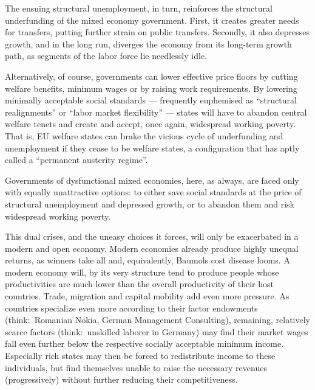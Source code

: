 The ensuing structural unemployment, in turn, reinforces the structural underfunding of the mixed economy government.
First, it creates greater needs for transfers, putting further strain on public transfers.
Secondly, it also depresses growth, and in the long run, diverges the economy from its long-term growth path, as segments of the labor force lie needlessly idle.


Alternatively, of course, governments can lower effective price floors by cutting welfare benefits, minimum wages or by raising work requirements.
By lowering minimally acceptable social standards --- frequently euphemised as ``structural realignments'' or ``labor market flexibility'' --- states will have to abandon central welfare tenets and create and accept, once again, widespread working poverty.
That is, \gls{EU} welfare states can brake the vicious cycle of underfunding and unemployment if they cease to be welfare states, a configuration that \cite{Streeck2010c} has aptly called a ``permanent austerity regime''.

Governments of dysfunctional mixed economies, here, as always, are faced only with equally unattractive options:
to either save social standards at the price of structural unemployment and depressed growth, or to abandon them and risk widespread working poverty.

This dual crises, and the uneasy choices it forces, will only be exacerbated in a modern and open economy.
Modern economies already produce highly unequal returns, as winners take all and, equivalently, Baumols cost disease looms.
A modern economy will, by its very structure tend to produce people whose productivities are much lower than the overall productivity of their host countries.
Trade, migration and capital mobility add even more pressure.
As countries specialize even more according to their factor endowments (think:\ Romanian Nokia, German Management Consulting), remaining, relatively scarce factors (think:\ unskilled laborer in Germany) may find their market wages fall even further below the respective socially acceptable minimum income.
Especially rich states may then be forced to redistribute income to these individuals, but find themselves unable to raise the necessary revenues (progressively) without further reducing their competitiveness.


